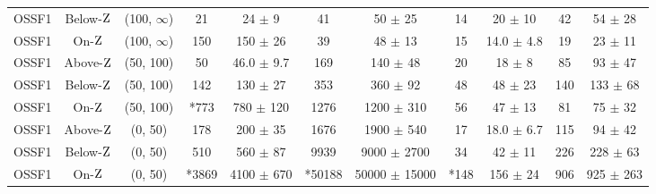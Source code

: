 \begin{sidewaystable*}[!hbtp]
\begin{tabular}{ccc|cc|cc|cc|cc}
OSSF1 & Below-$\mathrm{Z}$ & (100, $\infty$) & 21 & 24 $\pm$ 9 & 41 & 50 $\pm$ 25 & 14 & 20 $\pm$ 10 & 42 & 54 $\pm$ 28 \\
OSSF1 & On-$\mathrm{Z}$ & (100, $\infty$) & 150 & 150 $\pm$ 26 & 39 & 48 $\pm$ 13 & 15 & 14.0 $\pm$ 4.8 & 19 & 23 $\pm$ 11 \\
OSSF1 & Above-$\mathrm{Z}$ & (50, 100) & 50 & 46.0 $\pm$ 9.7 & 169 & 140 $\pm$ 48 & 20 & 18 $\pm$ 8 & 85 & 93 $\pm$ 47 \\
OSSF1 & Below-$\mathrm{Z}$ & (50, 100) & 142 & 130 $\pm$ 27 & 353 & 360 $\pm$ 92 & 48 & 48 $\pm$ 23 & 140 & 133 $\pm$ 68 \\
OSSF1 & On-$\mathrm{Z}$ & (50, 100) & *773 & 780 $\pm$ 120 & 1276 & 1200 $\pm$ 310 & 56 & 47 $\pm$ 13 & 81 & 75 $\pm$ 32 \\
OSSF1 & Above-$\mathrm{Z}$ & (0, 50) & 178 & 200 $\pm$ 35 & 1676 & 1900 $\pm$ 540 & 17 & 18.0 $\pm$ 6.7 & 115 & 94 $\pm$ 42 \\
OSSF1 & Below-$\mathrm{Z}$ & (0, 50) & 510 & 560 $\pm$ 87 & 9939 & 9000 $\pm$ 2700 & 34 & 42 $\pm$ 11 & 226 & 228 $\pm$ 63 \\
OSSF1 & On-$\mathrm{Z}$ & (0, 50) & *3869 & 4100 $\pm$ 670 & *50188 & 50000 $\pm$ 15000 & *148 & 156 $\pm$ 24 & 906 & 925 $\pm$ 263 \\
\hline \hline
\end{tabular}
\end{sidewaystable*}


